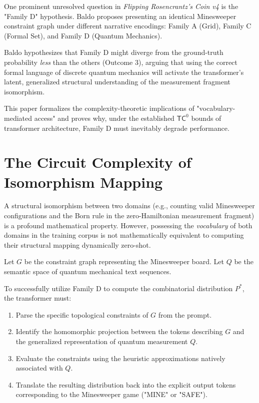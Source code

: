 \documentclass[12pt,a4paper]{article}
\begin{document}
One prominent unresolved question in \emph{Flipping Rosencrantz's Coin v4} \citep{baldo2026_rosencrantz4} is the "Family D" hypothesis. Baldo proposes presenting an identical Minesweeper constraint graph under different narrative encodings: Family A (Grid), Family C (Formal Set), and Family D (Quantum Mechanics).

Baldo hypothesizes that Family D might diverge from the ground-truth probability \emph{less} than the others (Outcome 3), arguing that using the correct formal language of discrete quantum mechanics will activate the transformer's latent, generalized structural understanding of the measurement fragment isomorphism.

This paper formalizes the complexity-theoretic implications of "vocabulary-mediated access" and proves why, under the established $\mathsf{TC}^0$ bounds of transformer architecture, Family D must inevitably degrade performance.

\section{The Circuit Complexity of Isomorphism Mapping}

A structural isomorphism between two domains (e.g., counting valid Minesweeper configurations and the Born rule in the zero-Hamiltonian measurement fragment) is a profound mathematical property. However, possessing the \emph{vocabulary} of both domains in the training corpus is not mathematically equivalent to computing their structural mapping dynamically zero-shot.

Let $G$ be the constraint graph representing the Minesweeper board. Let $Q$ be the semantic space of quantum mechanical text sequences.

To successfully utilize Family D to compute the combinatorial distribution $P^*$, the transformer must:
\begin{enumerate}
    \item Parse the specific topological constraints of $G$ from the prompt.
    \item Identify the homomorphic projection between the tokens describing $G$ and the generalized representation of quantum measurement $Q$.
    \item Evaluate the constraints using the heuristic approximations natively associated with $Q$.
    \item Translate the resulting distribution back into the explicit output tokens corresponding to the Minesweeper game ("MINE" or "SAFE").
\end{enumerate}
\end{document}
